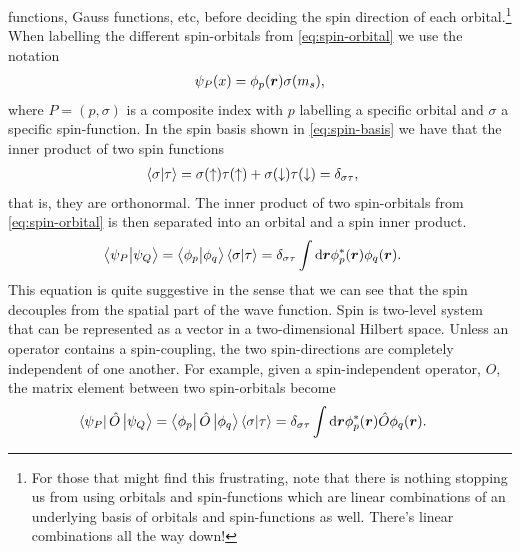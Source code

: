         functions, Gauss functions, etc, before deciding the spin direction of
        each orbital.\footnote{
            For those that might find this frustrating, note that there is
            nothing stopping us from using orbitals and spin-functions which are
            linear combinations of an underlying basis of orbitals and
            spin-functions as well.
            There's linear combinations all the way down!
        }
        When labelling the different spin-orbitals from
        \autoref{eq:spin-orbital} we use the notation
        \begin{align}
            \psi_P(x) = \phi_p(\boldsymbol{r})\sigma(m_s),
        \end{align}
        where $P = (p, \sigma)$ is a composite index with $p$ labelling a
        specific orbital and $\sigma$ a specific spin-function.
        In the spin basis shown in \autoref{eq:spin-basis} we have that the
        inner product of two spin functions
        \begin{align}
            \braket{\sigma}{\tau}
            &=
            \sigma(\uparrow)\tau(\uparrow)
            + \sigma(\downarrow)\tau(\downarrow)
            = \delta_{\sigma\tau},
        \end{align}
        that is, they are orthonormal.
        The inner product of two spin-orbitals from \autoref{eq:spin-orbital} is
        then separated into an orbital and a spin inner product.
        \begin{align}
            \braket{\psi_P}{\psi_Q}
            &= \braket{\phi_p}{\phi_q}\braket{\sigma}{\tau}
            = \delta_{\sigma\tau}
            \int\dd\boldsymbol{r}\phi^{*}_{p}(\boldsymbol{r})\phi_{q}(\boldsymbol{r}).
            \label{eq:inner-spin-orbital}
        \end{align}
        This equation is quite suggestive in the sense that we can see that the
        spin decouples from the spatial part of the wave function.
        Spin is two-level system that can be represented as a vector in a
        two-dimensional Hilbert space.
        Unless an operator contains a spin-coupling, the two spin-directions are
        completely independent of one another.
        For example, given a spin-independent operator, $\hat{O}$, the
        matrix element between two spin-orbitals become
        \begin{align}
            \bra{\psi_P}\hat{O}\ket{\psi_Q}
            &= \bra{\phi_p}\hat{O}\ket{\phi_q}\braket{\sigma}{\tau}
            = \delta_{\sigma\tau}
            \int\dd\boldsymbol{r}\phi^{*}_{p}(\boldsymbol{r})\hat{O}\phi_q(\boldsymbol{r}).
            \label{eq:example-spin-decoupling}
        \end{align}
